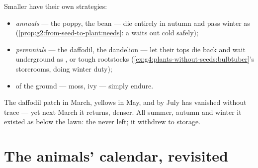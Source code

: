 \begin{proposition}\label{prop:g6:life-through-seasons:herbs}
Smaller  have their own strategies:
\begin{itemize}
  \item \emph{annuals} --- the poppy, the
        bean --- die entirely in autumn and pass winter as
        \emph{} (\cref{prop:g2:from-seed-to-plant:needs}:
        a  waits out cold safely);
  \item \emph{perennials} --- the
        daffodil, the dandelion --- let their tops die back
        and wait underground as ,  or tough
        rootstocks (\cref{ex:g4:plants-without-seeds:bulbtuber}'s
        storerooms, doing winter duty);
  \item {} of the ground --- moss, ivy --- simply
        endure.
\end{itemize}
\end{proposition}
\admitted

\begin{example}\label{ex:g6:life-through-seasons:daffodil}
The daffodil patch  in March, yellows in May, and by
July has vanished without trace --- yet next March it
returns, denser. All summer, autumn and winter it existed as
 below the lawn: the  never left; it withdrew to
storage.
\end{example}

\section{The animals' calendar, revisited}

